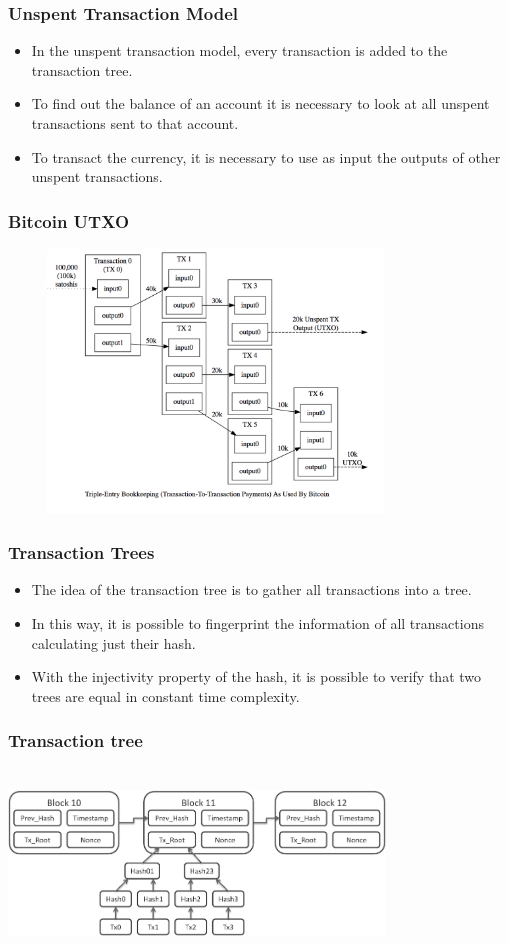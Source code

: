 \documentclass{beamer}
\begin{document}
\begin{frame}
   \frametitle{Unspent Transaction Model}
   \begin{itemize}[<+->]
     \item In the unspent transaction model, every transaction is added to the transaction tree.
     \item To find out the balance of an account it is necessary to look at all unspent transactions
       sent to that account.
     \item To transact the currency, it is necessary to use as input the outputs of
       other unspent transactions.
   \end{itemize}
\end{frame}

\begin{frame}
  \frametitle{Bitcoin UTXO}
    \includegraphics[width=11cm, height=7cm]{utxo}
\end{frame}

\begin{frame}
   \frametitle{Transaction Trees}
   \begin{itemize}[<+->]
     \item The idea of the transaction tree is to gather all transactions into a tree.
     \item In this way, it is possible to fingerprint the information of all transactions calculating just their hash.
     \item With the injectivity property of the hash, it is possible to verify that two trees are equal in constant time complexity.
   \end{itemize}
\end{frame}

\begin{frame}
  \frametitle{Transaction tree}
    \includegraphics[width=10cm, height=5cm]{blockchain}
\end{frame}
\end{document}
